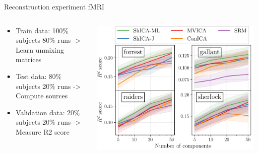 \documentclass[bigger]{beamer}
\begin{document}
\begin{frame}{Reconstruction experiment fMRI}

  \begin{columns}[T] %
    \begin{column}{.4\textwidth}
      \begin{itemize}
      \item Train data: 100\% subjects 80\% runs -> Learn unmixing matrices
      \item Test data: 80\% subjects 20\% runs -> Compute sources
      \item Validation data: 20\% subjects 20\% runs -> Measure R2 score
      \end{itemize}
    \end{column}%
    \hfill%
    \begin{column}{.6\textwidth}
      \begin{center}
        \includegraphics[width=\linewidth]{./figures/reconstruction.pdf}
      \end{center}
    \end{column}%
  \end{columns}
\end{frame}
\end{document}
